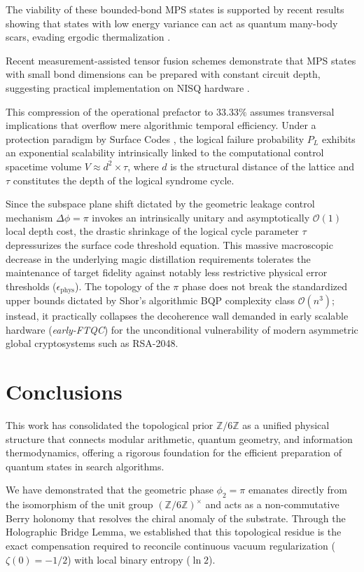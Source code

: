 \documentclass[reprint,aps,pra,superscriptaddress,nofootinbib]{revtex4-2}
\theoremstyle{plain}
\theoremstyle{definition}
\theoremstyle{remark}
\begin{document}
The viability of these bounded-bond MPS states is supported by recent results showing that states with low energy variance can act as quantum many-body scars, evading ergodic thermalization \cite{Rai2024}.

Recent measurement-assisted tensor fusion schemes demonstrate that MPS states with small bond dimensions can be prepared with constant circuit depth, suggesting practical implementation on NISQ hardware \cite{Stephen2025}.

This compression of the operational prefactor to $33.33\%$ assumes transversal implications that overflow mere algorithmic temporal efficiency. Under a protection paradigm by Surface Codes \cite{Fowler2012}, the logical failure probability $P_L$ exhibits an exponential scalability intrinsically linked to the computational control spacetime volume $V \approx d^2 \times \tau$, where $d$ is the structural distance of the lattice and $\tau$ constitutes the depth of the logical syndrome cycle.

Since the subspace plane shift dictated by the geometric leakage control mechanism $\Delta\phi = \pi$ invokes an intrinsically unitary and asymptotically $\mathcal{O}(1)$ local depth cost, the drastic shrinkage of the logical cycle parameter $\tau$ depressurizes the surface code threshold equation. This massive macroscopic decrease in the underlying magic distillation requirements tolerates the maintenance of target fidelity against notably less restrictive physical error thresholds ($\epsilon_{\text{phys}}$). The topology of the $\pi$ phase does not break the standardized upper bounds dictated by Shor's algorithmic BQP complexity class $\mathcal{O}(n^3)$; instead, it practically collapses the decoherence wall demanded in early scalable hardware (\textit{early-FTQC}) for the unconditional vulnerability of modern asymmetric global cryptosystems such as RSA-2048.

\section{Conclusions}
\label{sec:conclusiones}

This work has consolidated the topological prior $\mathbb{Z}/6\mathbb{Z}$ as a unified physical structure that connects modular arithmetic, quantum geometry, and information thermodynamics, offering a rigorous foundation for the efficient preparation of quantum states in search algorithms.

We have demonstrated that the geometric phase $\phi_2 = \pi$ emanates directly from the isomorphism of the unit group $(\mathbb{Z}/6\mathbb{Z})^{\times}$ and acts as a non-commutative Berry holonomy that resolves the chiral anomaly of the substrate. Through the Holographic Bridge Lemma, we established that this topological residue is the exact compensation required to reconcile continuous vacuum regularization ($\zeta(0) = -1/2$) with local binary entropy ($\ln 2$). 
\end{document}
